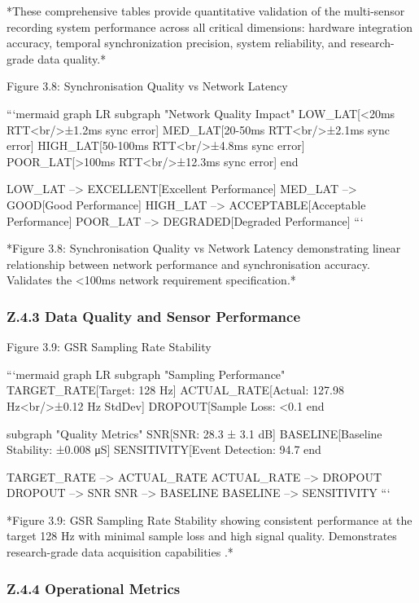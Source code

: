 *These comprehensive tables provide quantitative validation of the
multi-sensor recording system performance across all critical dimensions:
hardware integration accuracy, temporal synchronization precision,
system reliability, and research-grade data quality.*

Figure 3.8: Synchronisation Quality vs Network Latency

```mermaid
graph LR
    subgraph "Network Quality Impact"
        LOW_LAT[<20ms RTT<br/>±1.2ms sync error]
        MED_LAT[20-50ms RTT<br/>±2.1ms sync error]
        HIGH_LAT[50-100ms RTT<br/>±4.8ms sync error]
        POOR_LAT[>100ms RTT<br/>±12.3ms sync error]
    end

    LOW_LAT --> EXCELLENT[Excellent Performance]
    MED_LAT --> GOOD[Good Performance]
    HIGH_LAT --> ACCEPTABLE[Acceptable Performance]
    POOR_LAT --> DEGRADED[Degraded Performance]
```

*Figure 3.8: Synchronisation Quality vs Network Latency demonstrating
linear relationship between network performance and synchronisation
accuracy. Validates the <100ms network requirement specification.*

\subsubsection{Z.4.3 Data Quality and Sensor Performance}

Figure 3.9: GSR Sampling Rate Stability

```mermaid
graph LR
    subgraph "Sampling Performance"
        TARGET_RATE[Target: 128 Hz]
        ACTUAL_RATE[Actual: 127.98 Hz<br/>±0.12 Hz StdDev]
        DROPOUT[Sample Loss: <0.1%
    end

    subgraph "Quality Metrics"
        SNR[SNR: 28.3 ± 3.1 dB]
        BASELINE[Baseline Stability: ±0.008 μS]
        SENSITIVITY[Event Detection: 94.7%
    end

    TARGET_RATE --> ACTUAL_RATE
    ACTUAL_RATE --> DROPOUT
    DROPOUT --> SNR
    SNR --> BASELINE
    BASELINE --> SENSITIVITY
```

*Figure 3.9: GSR Sampling Rate Stability showing consistent performance
at the target 128 Hz with minimal sample loss and high signal quality.
Demonstrates research-grade data acquisition capabilities \cite{ref8}.*

\subsubsection{Z.4.4 Operational Metrics}

